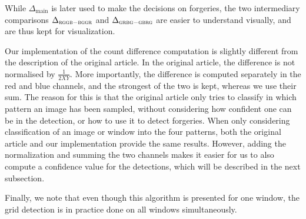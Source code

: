 \documentclass{ipol}
\begin{document}
While $\Delta_{\mathrm{main}}$ is later used to make the decisions on forgeries, the two intermediary comparisons $\Delta_{\textsc{rggb}-\textsc{bggr}}$ and $\Delta_{\textsc{grbg}-\textsc{gbrg}}$ are easier to understand visually, and are thus kept for visualization.

Our implementation of the count difference computation is slightly different from the description of the original article. In the original article, the difference is not normalised by $\frac 1 {2XY}$. More importantly, the difference is computed separately in the red and blue channels, and the strongest of the two is kept, whereas we use their sum.
The reason for this is that the original article only tries to classify in which pattern an image has been sampled, without considering how confident one can be in the detection, or how to use it to detect forgeries. When only considering classification of an image or window into the four patterns, both the original article and our implementation provide the same results. However, adding the normalization and summing the two channels makes it easier for us to also compute a confidence value for the detections, which will be described in the next subsection.

Finally, we note that even though this algorithm is presented for one window, the grid detection is in practice done on all windows simultaneously.
\end{document}
